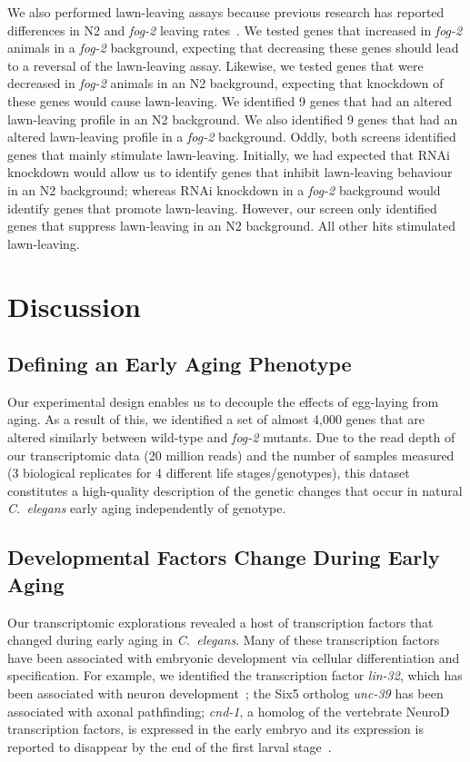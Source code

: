 \documentclass[9pt,twocolumn,twoside]{gsag3jnl}
\newcommand{\cel}{\emph{C.~elegans}}
\newcommand{\fog}{\emph{fog-2}}
\begin{document}
We also performed lawn-leaving assays because previous research has reported differences in N2 and \fog{} leaving rates~\citep{}. We tested genes that increased in \fog{} animals in a \fog{} background, expecting that decreasing these genes should lead to a reversal of the lawn-leaving assay. Likewise, we tested genes that were decreased in \fog{} animals in an N2 background, expecting that knockdown of these genes would cause lawn-leaving. We identified 9 genes that had an altered lawn-leaving profile in an N2 background.
We also identified 9 genes that had an altered lawn-leaving profile in a \fog{} background. Oddly, both screens identified  genes that mainly stimulate lawn-leaving. Initially, we had expected that RNAi knockdown would allow us to identify genes that inhibit lawn-leaving behaviour in an N2 background; whereas RNAi knockdown in a \fog{} background would identify genes that promote lawn-leaving. However, our screen only identified genes that suppress lawn-leaving in an N2 background. All other hits stimulated lawn-leaving.

\section*{Discussion}
\label{sec:discussion}

\subsection*{Defining an Early Aging Phenotype}
\label{sub:Defining an Early Aging Phenotype}

Our experimental design enables us to decouple the effects of egg-laying from aging. As a result of this, we identified a set of almost 4,000 genes that are altered similarly between wild-type and \fog{} mutants. Due to the read depth of our transcriptomic data (20 million reads) and the number of samples measured (3 biological replicates for 4 different life stages/genotypes), this dataset constitutes a high-quality description of the genetic changes that occur in natural \cel{} early aging independently of genotype.

\subsection*{Developmental Factors Change During Early Aging}
\label{sub:development_in_aging}

Our transcriptomic explorations revealed a host of transcription factors that changed during early aging in \cel{}. Many of these transcription factors have been associated with embryonic development via cellular differentiation and specification. For example, we identified the transcription factor \emph{lin-32}, which has been associated with neuron development~\citep{}; the Six5 ortholog \emph{unc-39} has been associated with axonal pathfinding; \emph{cnd-1}, a homolog  of the vertebrate NeuroD transcription factors, is expressed in the early embryo and its expression is reported to disappear by the end of the first larval stage~\citep{}.
\end{document}
